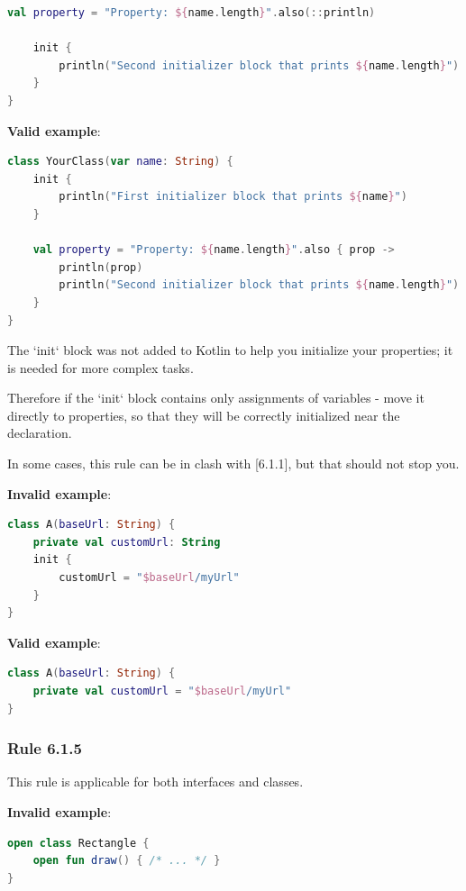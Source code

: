 {{{{\begin{lstlisting}[language=Kotlin]
    val property = "Property: ${name.length}".also(::println)

    init {
        println("Second initializer block that prints ${name.length}")
    }
}
\end{lstlisting}


\textbf{Valid example}:

\begin{lstlisting}[language=Kotlin]
class YourClass(var name: String) {
    init {
        println("First initializer block that prints ${name}")
    }

    val property = "Property: ${name.length}".also { prop ->
        println(prop)
        println("Second initializer block that prints ${name.length}")
    }
}
\end{lstlisting}


The `init` block was not added to Kotlin to help you initialize your properties; it is needed for more complex tasks.

Therefore if the `init` block contains only assignments of variables - move it directly to properties, so that they will be correctly initialized near the declaration.

In some cases, this rule can be in clash with [6.1.1], but that should not stop you.



\textbf{Invalid example}:

\begin{lstlisting}[language=Kotlin]
class A(baseUrl: String) {
    private val customUrl: String
    init {
        customUrl = "$baseUrl/myUrl"
    }
}
\end{lstlisting}


\textbf{Valid example}:

\begin{lstlisting}[language=Kotlin]
class A(baseUrl: String) {
    private val customUrl = "$baseUrl/myUrl"
}
\end{lstlisting}


\subsubsection*{\textbf{Rule 6.1.5}}
\leavevmode\newline

This rule is applicable for both interfaces and classes.



\textbf{Invalid example}:

\begin{lstlisting}[language=Kotlin]
open class Rectangle {
    open fun draw() { /* ... */ }
}


\end{lstlisting}}}}}
